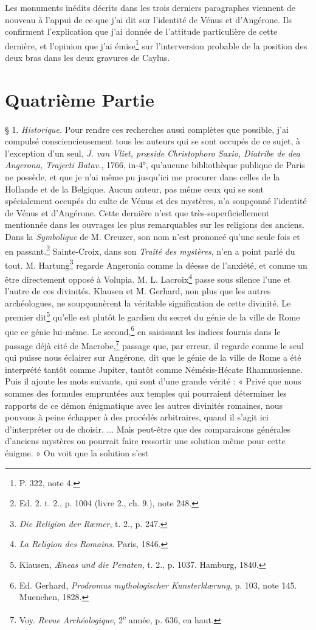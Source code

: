 \documentclass[a4paper, 11pt, oneside, polutonikogreek, french]{article}
\begin{document}
Les monuments inédits décrits dans les trois derniers paragraphes viennent de nouveau à l'appui de ce que j'ai dit sur l'identité de Vénus et d'Angérone. Ils confirment l'explication que j'ai donnée de l'attitude particulière de cette dernière, et l'opinion que j'ai émise\footnote{P. 322, note 4.} sur l'interversion probable de la position des deux bras dans les deux gravures de Caylus.
\clearpage
\section{Quatrième Partie}
\paragraph{}
§ 1. \emph{Historique.} Pour rendre ces recherches aussi complètes que possible, j'ai compulsé consciencieusement tous les auteurs qui se sont occupés de ce sujet, à l'exception d'un seul, \emph{J. van Vliet, præside Christophoro Saxio, Diatribe de dea Angerona, Trajecti Batav.}, 1766, in-4°, qu'aucune bibliothèque publique de Paris ne possède, et que je n'ai même pu jusqu'ici me procurer dans celles de la Hollande et de la Belgique. Aucun auteur, pas même ceux qui se sont spécialement occupés du culte de Vénus et des mystères, n'a soupçonné l'identité de Vénus et d'Angérone. Cette dernière n'est que très-superficiellement mentionnée dans les ouvrages les plus remarquables sur les religions des anciens. Dans la \emph{Symbolique} de M. Creuzer, son nom n'est prononcé qu'une seule fois et en passant.\footnote{Ed. 2. t. 2., p. 1004 (livre 2., ch. 9.), note 248.} Sainte-Croix, dans son \emph{Traité des mystères}, n'en a point parlé du tout. M. Hartung\footnote{\emph{Die Religion der Rœmer}, t. 2., p. 247.} regarde Angeronia comme la déesse de l'anxiété, et comme un être directement opposé à Volupia. M. L. Lacroix\footnote{\emph{La Religion des Romains.} Paris, 1846.} passe sous silence l'une et l'autre de ces divinités. Klausen et M. Gerhard, non plus que les autres archéologues, ne soupçonnèrent la véritable signification de cette divinité. Le premier dit\footnote{Klausen, \emph{Æneas und die Penaten}, t. 2., p. 1037. Hamburg, 1840.} qu'elle est plutôt le gardien du secret du génie de la ville de Rome que ce génie lui-même. Le second,\footnote{Ed. Gerhard, \emph{Prodromus mythologischer Kunsterklærung}, p. 103, note 145. Muenchen, 1828.} en saisissant les indices fournis dans le passage déjà cité de Macrobe,\footnote{Voy. \emph{Revue Archéologique}, 2\textsuperscript{e} année, p. 636, en haut.} passage que, par erreur, il regarde comme le seul qui puisse nous éclairer sur Angérone, dit que le génie de la ville de Rome a été interprété tantôt comme Jupiter, tantôt comme Némésis-Hécate Rhamnusienne. Puis il ajoute les mots suivants, qui sont d'une grande vérité : « Privé que nous sommes des formules empruntées aux temples qui pourraient déterminer les rapports de ce démon énigmatique avec les autres divinités romaines, nous pouvons à peine échapper à des procédés arbitraires, quand il s'agit ici d'interpréter ou de choisir. ... Mais peut-être que des comparaisons générales d'anciens mystères on pourrait faire ressortir une solution même pour cette énigme. » On voit que la solution s'est 
\end{document}
